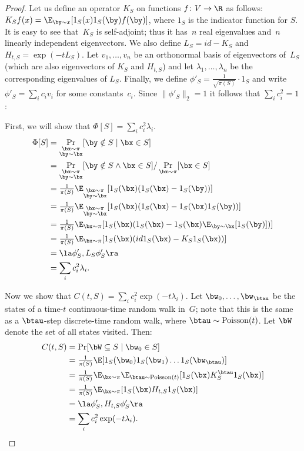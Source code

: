\documentclass[11pt]{article}
\begin{document}
\begin{proof}
Let us define an operator $K_S$ on functions $f \colon V \to \R$ as follows:  $K_Sf(x) = \E_{\by \sim x}[1_S(x)1_S(\by)f(\by)]$, where $1_S$ is the indicator function for $S$.  It is easy to see that~$K_S$ is self-adjoint; thus it has~$n$ real eigenvalues and~$n$ linearly independent eigenvectors.  We also define $L_S = id - K_S$ and $H_{t,S} = \exp(-tL_S)$.  Let $v_1, \dots, v_n$ be an orthonormal basis of eigenvectors of~$L_S$ (which are also eigenvectors of $K_S$ and $H_{t,S}$) and let $\lambda_1, \dots, \lambda_n$ be the corresponding eigenvalues of $L_S$. Finally, we define $\phi'_S = \tfrac{1}{\sqrt{\pi(S)}} \cdot 1_S$ and write $\phi'_S = \sum_i c_i v_i$ for some constants~$c_i$.  Since $\|\phi'_S\|_2 = 1$ it follows that $\sum_i c_i^2 = 1$:

First, we will show that $\Phi[S] =  \sum_i c_i^2 \lambda_i$.
\begin{align*}
\Phi[S] &= \Pr_{\substack{\bx \sim \pi \\ \by \sim \bx}}[\by \notin S \mid \bx \in S] \\
             &= \Pr_{\substack{\bx \sim \pi \\ \by \sim \bx}}[\by \notin S \wedge \bx \in S] / \Pr_{\bx \sim \pi}[\bx \in S] \\
             &= \tfrac{1}{\pi(S)}\E_{\substack{\bx \sim \pi \\ \by \sim \bx}}[1_S(\bx)(1_S(\bx)-1_S(\by))] \\
             &= \tfrac{1}{\pi(S)}\E_{\substack{\bx \sim \pi \\ \by \sim \bx}}[1_S(\bx)(1_S(\bx)-1_S(\bx) 1_S(\by))] \\
             &= \tfrac{1}{\pi(S)}\E_{\bx \sim \pi}[1_S(\bx)(1_S(\bx)-1_S(\bx)\E_{\by \sim \bx}[1_S(\by)])] \\
&= \tfrac{1}{\pi(S)}\E_{\bx \sim \pi}[1_S(\bx)(id1_S(\bx)-K_S1_S(\bx))] \\
&= \la \phi'_S, L_S \phi'_S \ra \\
             &= \sum_i c_i^2 \lambda_i.
\end{align*}

Now we show that $C(t,S) = \sum_i c_i^2 \exp(-t \lambda_i)$.  Let $\bw_0, \dots, \bw_{\btau}$ be the states of a time-$t$ continuous-time random walk in~$G$; note that this is the same as a $\btau$-step discrete-time random walk, where $\btau \sim \mathrm{Poisson}(t)$.  Let $\bW$ denote the set of all states visited.  Then:
\begin{align*}
C(t,S) &= \Pr[\bW \subseteq S \mid \bw_0 \in S] \\
           &= \tfrac{1}{\pi(S)}\E[1_S(\bw_0) 1_S(\bw_1) \ldots 1_S(\bw_{\btau})] \\
&= \tfrac{1}{\pi(S)} \E_{\bx \sim \pi}\E_{\btau \sim \mathrm{Poisson}(t)}[1_S(\bx)K^{\btau}_S 1_S(\bx)] \\
           &= \tfrac{1}{\pi(S)}\E_{\bx \sim \pi}[1_S(\bx)H_{t,S}1_S(\bx)] \\
           &= \la \phi'_S, H_{t,S} \phi'_S \ra \\
           &= \sum_i c_i^2 \exp(-t \lambda_i).
\end{align*}


\end{proof}
\end{document}
